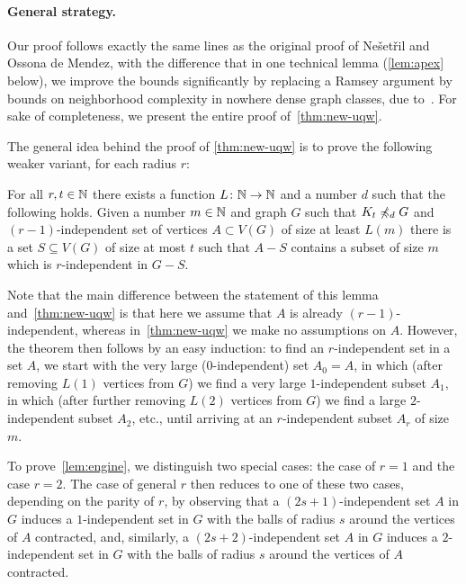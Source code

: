 \paragraph{General strategy.}
Our proof follows exactly the same lines as the original proof of Ne\v set\v ril and Ossona de Mendez, with the difference that in one technical lemma (\cref{lem:apex} below), we improve the bounds significantly by replacing a Ramsey argument by bounds on neighborhood
complexity in nowhere dense graph classes, due to~\cite{gajarsky2017kernelization}.
For sake of completeness, we present the entire proof of~\cref{thm:new-uqw}.


The general idea behind the proof of 
\cref{thm:new-uqw} is to prove the following 
weaker variant, for each radius $r$:

\begin{lemma}\label{lem:engine}
For all $r,t\in \mathbb{N}$ there exists a function $L\colon \mathbb{N}\to \mathbb{N}$
and a number $d$ such that the following holds.
Given a number $m\in \mathbb{N}$ and graph $G$ such that $K_t\not\preccurlyeq_d G$ and
$(r-1)$-independent set of vertices $A\subset V(G)$ of size at least $L(m)$ there is a set $S\subseteq V(G)$ of size at most $t$ such that $A-S$ contains a subset of size $m$ which is $r$-independent in $G-S$.
\end{lemma}

Note that the main difference between the statement of this lemma and~\cref{thm:new-uqw} is that here we assume that 
$A$ is already $(r-1)$-independent, whereas in~\cref{thm:new-uqw} we make no assumptions on $A$. However, the theorem then follows by an easy induction: to find an $r$-independent set in a set $A$, we start with 
the very large ($0$-independent) set $A_0=A$, in which (after removing 
$L(1)$ vertices from $G$)
we find a very large $1$-independent subset $A_1$, in which (after further removing $L(2)$ vertices from $G$) we find a large $2$-independent subset $A_2$, etc., until arriving at an $r$-independent subset $A_r$ of size $m$.

To prove~\cref{lem:engine}, we distinguish two special cases: the case of $r=1$ and the case $r=2$. The case of general $r$ then reduces to one of these two cases, depending on the parity of $r$, by observing that a $(2s+1)$-independent set $A$ in $G$
induces a $1$-independent set in $G$ with the balls of radius $s$ around the vertices of $A$ contracted, and,
similarly, a $(2s+2)$-independent set $A$ in $G$
induces a $2$-independent set in $G$ with the balls of radius $s$ around the vertices of $A$ contracted.

